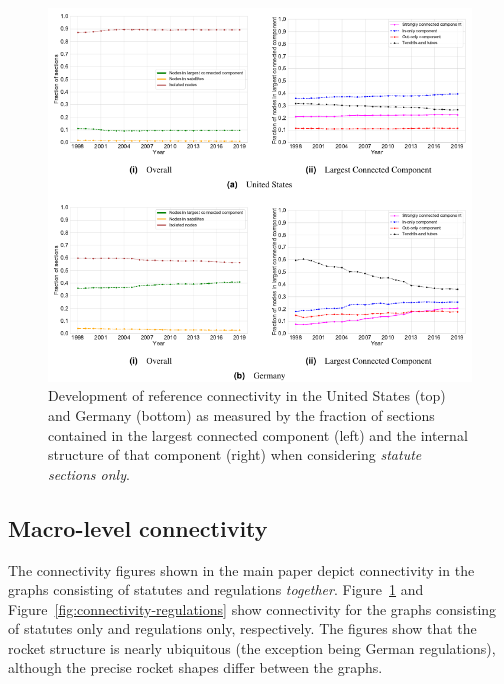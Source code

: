 \documentclass[utf8,sort&compress,numbers,square,table,hidelinks]{frontiers_suppmat} %
\begin{document}
\begin{figure}
	\centering
	\includegraphics[width=\textwidth]{figure_si_connectivity_statutes}
	\caption{Development of reference connectivity in the United States (top) and Germany (bottom) as measured by the fraction of sections contained in the largest connected component (left) and the internal structure of that component (right) when considering \emph{statute sections only}.}\label{fig:connectivity-statutes}
\end{figure}

\vspace*{12pt}
\subsection{Macro-level connectivity}

The connectivity figures shown in the main paper depict connectivity in the graphs consisting of statutes and regulations \emph{together}.
Figure~\ref{fig:connectivity-statutes} and Figure~\ref{fig:connectivity-regulations} show connectivity for the graphs consisting of statutes only and regulations only, respectively.
The figures show that the rocket structure is nearly ubiquitous (the exception being German regulations), although the precise rocket shapes differ between the graphs.
\end{document}
